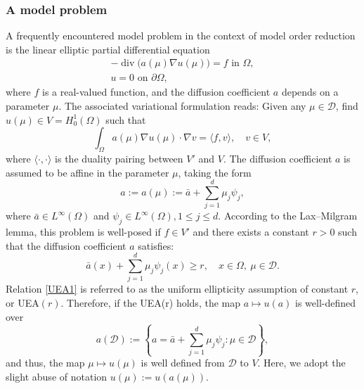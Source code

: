 \documentclass[12pt]{article}
\theoremstyle{remark}
\theoremstyle{definition}
\numberwithin{equation}{section}
\begin{document}
\subsubsection{A model problem}
A frequently encountered model problem in the context of model order reduction is the linear elliptic partial differential equation
\begin{equation}
    \begin{aligned}
    -\operatorname{div} \big(a(\mu) \nabla u(\mu) \big)=f  \text { in } \Omega, \\
    u=0  \text { on } \partial \Omega,
    \label{the pde}
\end{aligned}
\end{equation}
where $f$ is a real-valued function, and the diffusion coefficient $a$ depends on a parameter 
$\mu$. The associated variational formulation reads: Given any $\mu \in \mathcal{D}$, find $u(\mu) \in V=H_0^1(\Omega)$ such that
\begin{equation}
    \int_\Omega a(\mu) \nabla u(\mu) \cdot \nabla v=\langle f, v\rangle, \quad v \in V,
    \label{var model}
\end{equation}
where $\langle \cdot, \cdot\rangle$ is the duality pairing between $V'$ and $V$. The diffusion coefficient $a$ is assumed to be affine in the parameter $\mu$, taking the form
\begin{equation}
   a:=a(\mu):= \bar{a}+\sum_{j=1}^d \mu_j \psi_j,
\end{equation}
where $\bar{a}\in L^{\infty}(\Omega)$ and  $\psi_j \in L^{\infty}(\Omega), 1\leq j \leq d$. According to the Lax–Milgram lemma, this problem is well-posed if $f \in V'$ and there exists a constant $r > 0$ such that the diffusion coefficient $a$ satisfies:
\begin{equation}
   \bar{a}(x)+\sum_{j=1}^d \mu_j \psi_j(x) \geq r, \quad  x\in \Omega,\ \mu \in \mathcal{D}.
    \label{UEA1}
\end{equation}
Relation \eqref{UEA1} is referred to as the uniform ellipticity assumption of constant $r$, or UEA$(r)$. Therefore, if the UEA(r) holds, the map $a \mapsto u(a)$ is well-defined over 
\begin{equation}
    a(\mathcal{D}):=\left\{a=\bar{a}+\sum_{j=1}^d \mu_j \psi_j: \mu \in \mathcal{D}\right\},
\end{equation}
and thus, the map $\mu \mapsto u(\mu)$ is well defined from $\mathcal{D}$ to $V$. Here, we adopt the slight abuse of notation $ u(\mu):=u(a(\mu))$.
\end{document}
